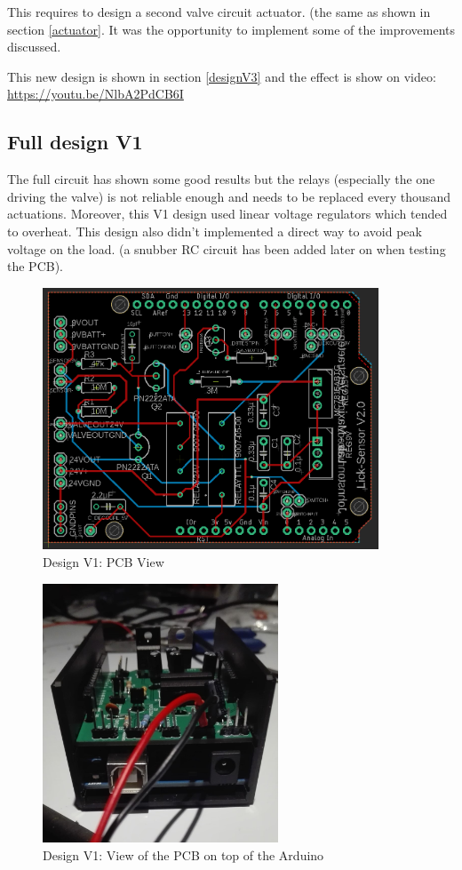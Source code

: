 \documentclass[a4paper]{article}
\begin{document}
This requires to design a second valve circuit actuator. (the same as shown in section \ref{actuator}.
It was the opportunity to implement some of the improvements discussed.

This new design is shown in section \ref{designV3} and the effect is show on video: \url{https://youtu.be/NlbA2PdCB6I}
\newpage
\subsection{Full design V1}
The full circuit has shown some good results but the relays (especially the one driving the valve) is not reliable enough and needs to be replaced every thousand actuations. 
Moreover, this V1 design used linear voltage regulators which tended to overheat.
This design also didn't implemented a direct way to avoid peak voltage on the load. (a snubber RC circuit has been added later on when testing the PCB).

\begin{figure}[h!b!t!]
    \centering
    \includegraphics[width = 10cm]{images/schematic.PNG}
    \caption{Design V1: PCB View}
    \label{fig:schematic}
\end{figure}

\begin{figure}[h!b!t!]
    \centering
    \includegraphics[width=7cm]{images/enclosure.jpg}
    \caption{Design V1: View of the PCB on top of the Arduino}
    \label{fig:my_label}
\end{figure}
\end{document}
